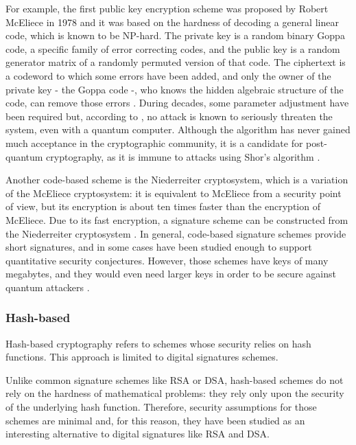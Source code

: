 \documentclass[a4paper,12pt]{article}
\begin{document}
For example, the first public key encryption scheme was proposed by Robert McEliece in 1978 \cite{27_Eliece} and it was based on the hardness of decoding a general linear code, which is known to be NP-hard.
The private key is a random binary Goppa code, a specific family of error correcting codes, and the public key is a random generator matrix of a randomly permuted version of that code. The ciphertext is a codeword to which some errors have been added, and only the owner of the private key - the Goppa code -, who knows the hidden algebraic structure of the code, can remove those errors \cite{29_ElieceCryptosystem}. During decades, some parameter adjustment have been required but, according to \cite{26_code_based}, no attack is known to seriously threaten the system, even with a quantum computer.
Although the algorithm has never gained much acceptance in the cryptographic community, it is a candidate for post-quantum cryptography, as it is immune to attacks using Shor's algorithm \cite{28_CodeAttacks}.

Another code-based scheme is the Niederreiter cryptosystem, which is a variation of the McEliece cryptosystem: it is equivalent to McEliece from a security point of view, but its encryption is about ten times faster than the encryption of McEliece. Due to its fast encryption, a signature scheme can be constructed from the Niederreiter cryptosystem .
In general, code-based signature schemes provide short signatures, and in some cases have been studied enough to support quantitative security conjectures. However, those schemes have keys of many megabytes, and they would even need larger keys in order to be secure against quantum attackers \cite{1_sphincspaper}.


\subsubsection{Hash-based}
\label{subsub:hashbased}

Hash-based cryptography refers to schemes whose security relies on hash functions. This approach is limited to digital signatures schemes. 

Unlike common signature schemes like RSA or DSA, hash-based schemes do not rely on the hardness of mathematical problems: they rely only upon the security of the underlying hash function. Therefore, security assumptions for those schemes are minimal \cite{9_postquantum_auth_openssl} and, for this reason, they have been studied as an interesting alternative to digital signatures like RSA and DSA.
\end{document}

